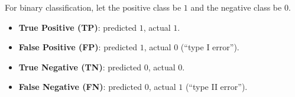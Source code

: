 \begin{definition}
    For binary classification, let the positive class be $1$ and the negative class be $0$.
    \begin{itemize}
        \item \textbf{True Positive (TP)}: predicted $1$, actual $1$.
        \item \textbf{False Positive (FP)}: predicted $1$, actual $0$ (``type I error'').
        \item \textbf{True Negative (TN)}: predicted $0$, actual $0$.
        \item \textbf{False Negative (FN)}: predicted $0$, actual $1$ (``type II error'').
    \end{itemize}
\end{definition}

